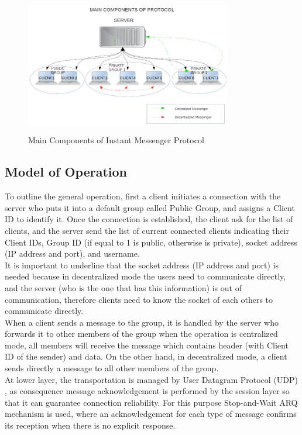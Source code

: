 \documentclass{article}
\begin{document}
\begin{figure}[t]
\centering
\includegraphics[width=9cm, height=6cm]{Maincomponents.jpg}
\caption{Main Components of Instant Messenger Protocol}
\label{fig:Maincomponents}
\end{figure}

\subsection{Model of Operation}

To outline the general operation, first a client initiates a connection with the server who puts it into a default group called Public Group, and assigns a Client ID to identify it. Once the connection is established, the client ask for the list of clients, and the server send the list of current connected clients indicating their Client IDs, Group ID (if equal to 1 is public, otherwise is private), socket address (IP address and port), and username.\\

It is important to underline that the socket address (IP address and port) is needed because in decentralized mode the users need to communicate directly, and the server (who is the one that has this information) is out of communication, therefore clients need to know the socket of each others to communicate directly.\\

When a client sends a message to the group, it is handled by the server who forwards it to other members of the group when the operation is centralized mode, all members will receive the message which contains header (with Client ID of the sender) and data. On the other hand, in decentralized mode, a client sends directly a message to all other members of the group.\\

At lower layer, the transportation is managed by User Datagram Protocol (UDP) \cite{3}, as consequence message acknowledgement is performed by the session layer so that it can guarantee connection reliability. For this purpose Stop-and-Wait ARQ mechanism is used, where an acknowledgement for each type of message confirms its reception when there is no explicit response.\\
\end{document}
